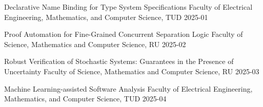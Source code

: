 \begin{multicols}{2}
         {Declarative Name Binding for Type System Specifications}
         {Faculty of Electrical Engineering, Mathematics, and Computer Science, TUD}
         {2025-01}
         
         {Proof Automation for Fine-Grained Concurrent Separation Logic}
         {Faculty of Science, Mathematics and Computer Science, RU}
         {2025-02}

         {Robust Verification of Stochastic Systems: Guarantees in the Presence of Uncertainty}
         {Faculty of Science, Mathematics and Computer Science, RU}
         {2025-03}

         {Machine Learning-assisted Software Analysis}
         {Faculty of Electrical Engineering, Mathematics, and Computer Science, TUD}
         {2025-04}

\end{multicols}